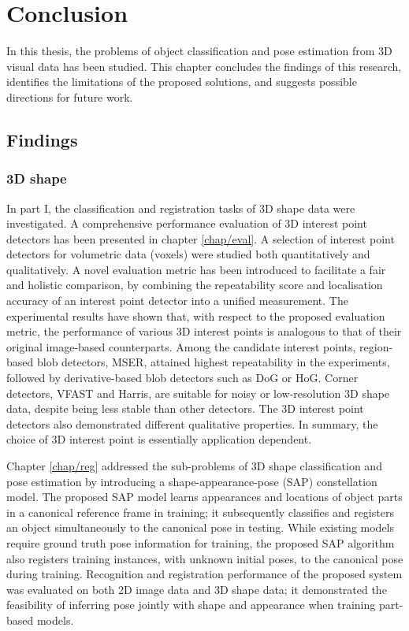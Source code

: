 \chapter{Conclusion}
\label{chap/conclusion}

In this thesis, the problems of object classification and pose estimation from 3D visual data has been studied. This chapter concludes the findings of this research, identifies the limitations of the proposed solutions, and suggests possible directions for future work.  

\section{Findings}

\subsection{3D shape}

In part I, the classification and registration tasks of 3D shape data were investigated. A comprehensive performance evaluation of 3D interest point detectors has been presented in chapter \ref{chap/eval}. A selection of interest point detectors for volumetric data (voxels) were studied both quantitatively and qualitatively. A novel evaluation metric has been introduced to facilitate a fair and holistic comparison, by combining the repeatability score and localisation accuracy of an interest point detector into a unified measurement. The experimental results have shown that, with respect to the proposed evaluation metric, the performance of various 3D interest points is analogous to that of their original image-based counterparts. Among the candidate interest points, region-based blob detectors, \eg MSER, attained highest repeatability in the experiments, followed by derivative-based blob detectors such as DoG or HoG. Corner detectors, \eg VFAST and Harris, are suitable for noisy or low-resolution 3D shape data, despite being less stable than other detectors. The 3D interest point detectors also demonstrated different qualitative properties. In summary, the choice of 3D interest point is essentially application dependent. 

Chapter \ref{chap/reg} addressed the sub-problems of 3D shape classification and pose estimation by introducing a shape-appearance-pose (SAP) constellation model. The proposed SAP model learns appearances and locations of object parts in a canonical reference frame in training; it subsequently classifies and registers an object simultaneously to the canonical pose in testing. While existing models require ground truth pose information for training, the proposed SAP algorithm also registers training instances, with unknown initial poses, to the canonical pose during training. Recognition and registration performance of the proposed system was evaluated on both 2D image data and 3D shape data; it demonstrated the feasibility of inferring pose jointly with shape and appearance when training part-based models. 

